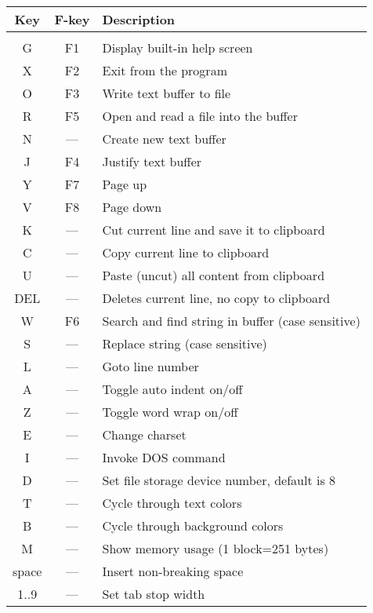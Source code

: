 \documentclass{article}
\begin{document}
    \begin{longtable}[l]{c c l}
        \textbf{Key} & \textbf{F-key} & \textbf{Description} \\
        \hline \\
        G    & F1    & Display built-in help screen \\
        X    & F2    & Exit from the program \\
        O    & F3    & Write text buffer to file \\
        R    & F5    & Open and read a file into the buffer \\
        N    & ---   & Create new text buffer \\
        J    & F4    & Justify text buffer \\
        Y    & F7    & Page up \\
        V    & F8    & Page down \\
        K    & ---   & Cut current line and save it to clipboard \\
        C    & ---   & Copy current line to clipboard \\
        U    & ---   & Paste (uncut) all content from clipboard \\
        DEL  & ---   & Deletes current line, no copy to clipboard \\
        W    & F6    & Search and find string in buffer (case sensitive) \\
        S    & ---   & Replace string (case sensitive) \\
        L    & ---   & Goto line number \\
        A    & ---   & Toggle auto indent on/off \\
        Z    & ---   & Toggle word wrap on/off \\
        E    & ---   & Change charset\\
        I    & ---   & Invoke DOS command\\
        D    & ---   & Set file storage device number, default is 8 \\
        T    &  ---  & Cycle through text colors \\
        B    &  ---  & Cycle through background colors \\
        M    &  ---  & Show memory usage (1 block=251 bytes) \\
        space& ---   & Insert non-breaking space \\
        1..9 & ---   & Set tab stop width
    \end{longtable}
\end{document}
